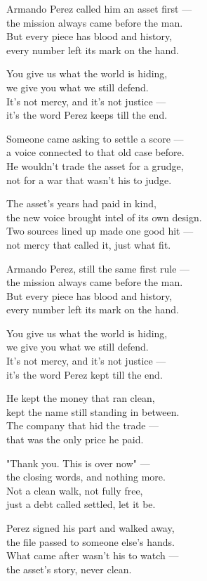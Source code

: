 \begin{lyrics}
Armando Perez called him an asset first —\\
the mission always came before the man.\\
But every piece has blood and history,\\
every number left its mark on the hand.

You give us what the world is hiding,\\
we give you what we still defend.\\
It's not mercy, and it's not justice —\\
it's the word Perez keeps till the end.

Someone came asking to settle a score —\\
a voice connected to that old case before.\\
He wouldn't trade the asset for a grudge,\\
not for a war that wasn't his to judge.

The asset's years had paid in kind,\\
the new voice brought intel of its own design.\\
Two sources lined up made one good hit —\\
not mercy that called it, just what fit.

Armando Perez, still the same first rule —\\
the mission always came before the man.\\
But every piece has blood and history,\\
every number left its mark on the hand.

You give us what the world is hiding,\\
we give you what we still defend.\\
It's not mercy, and it's not justice —\\
it's the word Perez kept till the end.

He kept the money that ran clean,\\
kept the name still standing in between.\\
The company that hid the trade —\\
that was the only price he paid.

"Thank you. This is over now" —\\
the closing words, and nothing more.\\
Not a clean walk, not fully free,\\
just a debt called settled, let it be.

Perez signed his part and walked away,\\
the file passed to someone else's hands.\\
What came after wasn't his to watch —\\
the asset's story, never clean.
\end{lyrics}

